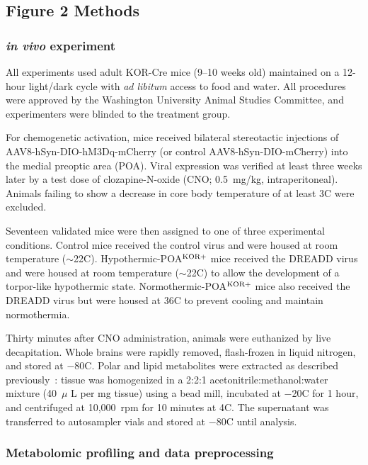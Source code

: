 \documentclass{article}
\begin{document}
\subsection{Figure 2 Methods}

\subsubsection{\textit{in vivo} experiment}

All experiments used adult KOR-Cre mice (9–10 weeks old) maintained on a 12-hour light/dark cycle with \textit{ad libitum} access to food and water. All procedures were approved by the Washington University Animal Studies Committee, and experimenters were blinded to the treatment group.

For chemogenetic activation, mice received bilateral stereotactic injections of AAV8-hSyn-DIO-hM3Dq-mCherry (or control AAV8-hSyn-DIO-mCherry) into the medial preoptic area (POA). Viral expression was verified at least three weeks later by a test dose of clozapine-N-oxide (CNO; 0.5~mg/kg, intraperitoneal). Animals failing to show a decrease in core body temperature of at least 3\textdegree C were excluded.

Seventeen validated mice were then assigned to one of three experimental conditions. Control mice received the control virus and were housed at room temperature ($\sim$22\textdegree C). Hypothermic-POA$\textsuperscript{KOR+}$ mice received the DREADD virus and were housed at room temperature ($\sim$22\textdegree C) to allow the development of a torpor-like hypothermic state. Normothermic-POA$\textsuperscript{KOR+}$ mice also received the DREADD virus but were housed at 36\textdegree C to prevent cooling and maintain normothermia.

Thirty minutes after CNO administration, animals were euthanized by live decapitation. Whole brains were rapidly removed, flash-frozen in liquid nitrogen, and stored at $-80$\textdegree C. Polar and lipid metabolites were extracted as described previously~\cite{kamal_preoptic_2025}: tissue was homogenized in a 2:2:1 acetonitrile:methanol:water mixture (40~$\mu$ L per mg tissue) using a bead mill, incubated at $-$20\textdegree C for 1 hour, and centrifuged at 10,000~rpm for 10 minutes at 4\textdegree C. The supernatant was transferred to autosampler vials and stored at $-$80\textdegree C until analysis.

\subsubsection{Metabolomic profiling and data preprocessing}
\end{document}

